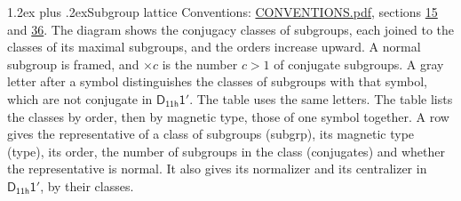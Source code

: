 \documentclass[10pt,a4paper]{article}
\makeatletter
\renewcommand\section{\@startsection{section}{1}{\z@}{-3ex plus -1ex minus -.2ex}%
  {1.2ex plus .2ex}{\normalfont\large\sffamily\bfseries\color{parttitle}}}
\numberwithin{equation}{section}
\newcommand{\grp}[1]{\mathsf{#1}}
\makeatother
\begin{document}
\section{Subgroup lattice}\label{s:subgroups}
Conventions: \href{../../CONVENTIONS.pdf}{CONVENTIONS.pdf}, sections \href{../../../rotation/CONVENTIONS.pdf\#conv.15}{15} and \href{../../CONVENTIONS.pdf\#conv.36}{36}.
The diagram shows the conjugacy classes of subgroups, each joined to the classes of its maximal subgroups, and the orders increase upward. \label{n:index.conjugates.c}\label{n:mark.conjugates}A normal subgroup is framed, and ${\times}c$ is the number $c > 1$ of conjugate subgroups. \label{n:mark.letter}A gray letter after a symbol distinguishes the classes of subgroups with that symbol, which are not conjugate in $\grp{D_{11h}1'}$. The table uses the same letters. The table lists the classes by order, then by magnetic type, those of one symbol together. \label{n:head.subgroup}\label{n:head.magnetic.type}\label{n:head.order}\label{n:head.conjugates}\label{n:head.normal}A row gives the representative of a class of subgroups (subgrp), its magnetic type (type), its order, the number of subgroups in the class (conjugates) and whether the representative is normal. \label{n:head.normalizer}\label{n:head.centralizer}It also gives its normalizer and its centralizer in $\grp{D_{11h}1'}$, by their classes. 
\end{document}
